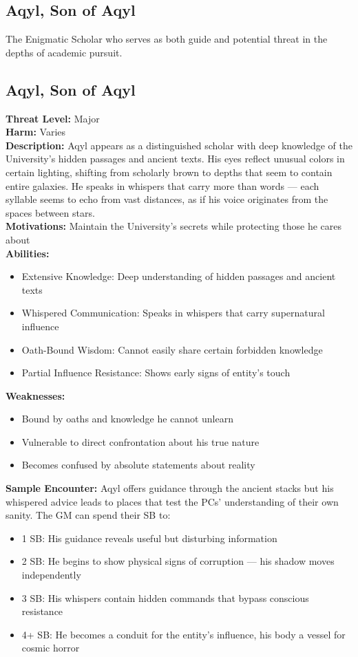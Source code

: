 \documentclass[11pt]{article}
\newenvironment{monsterentry}[1]{%
  \begin{mdframed}[backgroundcolor=shadecolor, linewidth=0pt, leftmargin=0pt, rightmargin=0pt]%
  \subsection*{#1}%
}{%
  \end{mdframed}%
}
\begin{document}
\subsection{Aqyl, Son of Aqyl}

The Enigmatic Scholar who serves as both guide and potential threat in the depths of academic pursuit.

\begin{monsterentry}{Aqyl, Son of Aqyl}
\textbf{Threat Level:} Major \\
\textbf{Harm:} Varies \\
\textbf{Description:} Aqyl appears as a distinguished scholar with deep knowledge of the University's hidden passages and ancient texts. His eyes reflect unusual colors in certain lighting, shifting from scholarly brown to depths that seem to contain entire galaxies. He speaks in whispers that carry more than words --- each syllable seems to echo from vast distances, as if his voice originates from the spaces between stars. \\
\textbf{Motivations:} Maintain the University's secrets while protecting those he cares about \\
\textbf{Abilities:}
\begin{itemize}
    \item Extensive Knowledge: Deep understanding of hidden passages and ancient texts
    \item Whispered Communication: Speaks in whispers that carry supernatural influence
    \item Oath-Bound Wisdom: Cannot easily share certain forbidden knowledge
    \item Partial Influence Resistance: Shows early signs of entity's touch
\end{itemize}
\textbf{Weaknesses:}
\begin{itemize}
    \item Bound by oaths and knowledge he cannot unlearn
    \item Vulnerable to direct confrontation about his true nature
    \item Becomes confused by absolute statements about reality
\end{itemize}
\textbf{Sample Encounter:} Aqyl offers guidance through the ancient stacks but his whispered advice leads to places that test the PCs' understanding of their own sanity. The GM can spend their SB to:
\begin{itemize}
    \item 1 SB: His guidance reveals useful but disturbing information
    \item 2 SB: He begins to show physical signs of corruption --- his shadow moves independently
    \item 3 SB: His whispers contain hidden commands that bypass conscious resistance
    \item 4+ SB: He becomes a conduit for the entity's influence, his body a vessel for cosmic horror
\end{itemize}
\end{monsterentry}
\end{document}
